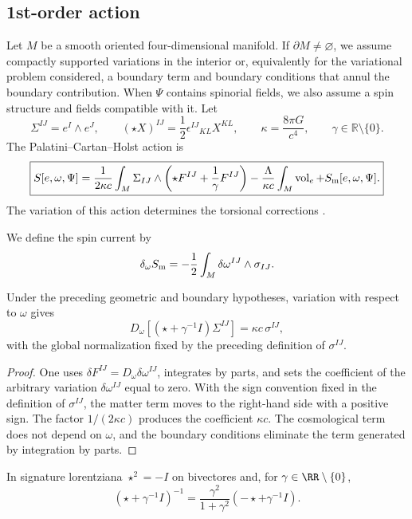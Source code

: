 \subsection{1st-order action}

Let \(M\) be a smooth oriented four-dimensional manifold. If
\(\partial M\ne\varnothing\), we assume compactly supported variations in the
interior or, equivalently for the variational problem considered, a
boundary term and boundary conditions that annul the boundary
contribution. When \(\Psi\) contains spinorial fields, we also assume a
spin structure and fields compatible with it. Let
\[
 \Sigma^{IJ}=e^I\wedge e^J,
 \qquad
 (\star X)^{IJ}=\frac12\epsilon^{IJ}{}_{KL}X^{KL},
 \qquad
 \kappa=\frac{8\pi G}{c^4},
 \qquad
 \gamma\in\mathbb R\setminus\{0\}.
\]
The Palatini--Cartan--Holst action is
\[
\boxed{
 S[e,\omega,\Psi]
 =\frac1{2\kappa c}\int_M
 \Sigma_{IJ}\wedge\left(\star F^{IJ}+\frac1\gamma F^{IJ}\right)
 -\frac\Lambda{\kappa c}\int_M\operatorname{vol}_e
 +S_{\rm m}[e,\omega,\Psi].}
\]
The variation of this action determines the torsional corrections
\cite{Sciama1964,Kibble1961,Hehl1976,Holst1996}.

We define the spin current by
\[
 \delta_\omega S_{\rm m}
 =-\frac12\int_M\delta\omega^{IJ}\wedge\sigma_{IJ}.
\]

\begin{theorem}
Under the preceding geometric and boundary hypotheses, variation with respect
to \(\omega\) gives
\[
 D_\omega\!\left[(\star+\gamma^{-1}I)\Sigma^{IJ}\right]
 =\kappa c\,\sigma^{IJ},
\]
with the global normalization fixed by the preceding definition of
\(\sigma^{IJ}\).
\end{theorem}
\begin{proof}
One uses \(\delta F^{IJ}=D_\omega\delta\omega^{IJ}\), integrates by parts, and
sets the coefficient of the arbitrary variation
\(\delta\omega^{IJ}\) equal to zero. With the sign convention fixed in the definition of
\(\sigma^{IJ}\), the matter term moves to the right-hand side with a
positive sign. The factor \(1/(2\kappa c)\) produces the coefficient
\(\kappa c\). The cosmological term does not depend on \(\omega\), and the
boundary conditions eliminate the term generated by integration by
parts.
\end{proof}

In signature lorentziana \(\star^2=-I\) on bivectores and, for
\(\gamma\in\RR\setminus\{0\}\),
\[
 (\star+\gamma^{-1}I)^{-1}
 =\frac{\gamma^2}{1+\gamma^2}(-\star+\gamma^{-1}I).
\]

